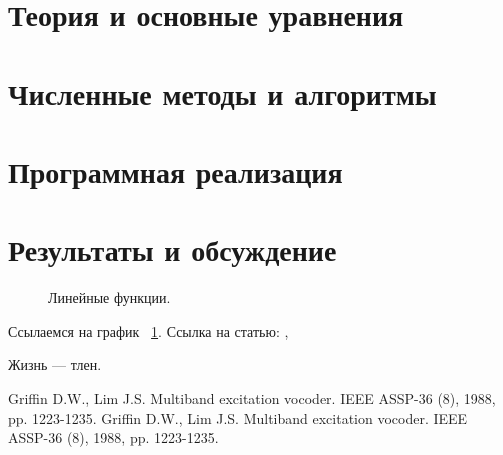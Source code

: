 \documentclass[a4paper,14pt]{extarticle}
\begin{document}
\section{Теория и основные уравнения}

\pagebreak
\section{Численные методы и алгоритмы}

\pagebreak
\section{Программная реализация}

\pagebreak
\section{Результаты и обсуждение}

\begin{figure}[ht]
\begin{center}

\caption{
\label{graph-fig}
     Линейные функции.}
\end {center}
\end {figure}

Ссылаемся на график ~\ref{graph-fig}.
Ссылка на статью: \cite{voc}, \cite{vo2}

Жизнь --- тлен.
\pagebreak




\begin{thebibliography}{1}
 Griffin D.W., Lim J.S. \flqq Multiband excitation vocoder\frqq. IEEE ASSP-36 (8), 1988, pp. 1223-1235.
 Griffin D.W., Lim J.S. \flqq Multiband excitation vocoder\frqq. IEEE ASSP-36 (8), 1988, pp. 1223-1235.
\end{thebibliography}
\end{document}
